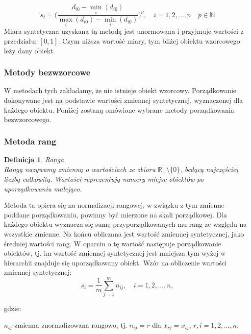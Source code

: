 \documentclass[12pt,a4paper]{report}
\newtheorem{definition}[theorem]{Definicja}
\begin{document}
$$s_{i}=\bigg(\frac{d_{i0}-\min\limits_{i}(d_{i0})}{\max\limits_{i}(d_{i0})-\min\limits_{i}(d_{i0})} \bigg)^{p}, \quad i=1,2,\dots,n \quad p \in \mathbb{N}
$$
Miara syntetyczna uzyskana tą metodą jest unormowana i przyjmuje wartości z przedziału: $[0,1]$. Czym niższa wartość miary, tym bliżej obiektu wzorcowego leży dany obiekt. 
\subsubsection{Metody bezwzorcowe}


W metodach tych zakładamy, że nie istnieje obiekt wzorcowy. %
Porządkowanie dokonywane jest na podstawie wartości zmiennej syntetycznej, wyznaczonej dla każdego obiektu. 
Poniżej zostaną omówione wybrane metody porządkowania bezwzorcowego.

\subsubsection{Metoda rang}

\begin{definition}{Ranga \cite[Rozdział 1.5]{panek2013}}\\
Rangą nazywamy zmienną o wartościach ze zbioru ${\mathbb{R}_{+}\setminus{\{0\}}}$, będącą najczęściej liczbą całkowitą. Wartości reprezentują numery miejsc obiektów po uporządkowaniu malejąco.
\end{definition}
Metoda ta opiera się na normalizacji rangowej, w związku z tym zmienne poddane porządkowaniu, powinny być mierzone na skali porządkowej. Dla każdego obiektu wyznacza się sumę przyporządkowanych mu rang ze względu na wszystkie zmienne. Na końcu obliczana jest wartość zmiennej syntetycznej, jako średniej wartości rang. W oparciu o tę wartość następuje porządkowanie obiektów, tj. im wartość zmiennej syntetycznej jest mniejsza tym wyżej w hierarchii znajduje się uporządkowany obiekt. Wzór na obliczenie wartości zmiennej syntetycznej: 
$$
s_{i}=\frac{1}{m}\sum_{j=1}^{m} n_{ij},\quad i=1, 2, \ldots, n,
$$

gdzie:

$n_{ij}$-zmienna znormalizowana rangowo, tj. $n_{ij}=r$ dla $x_{rj}=x_{ij}$,
$r,i=1, 2, \ldots, n,$
\end{document}
